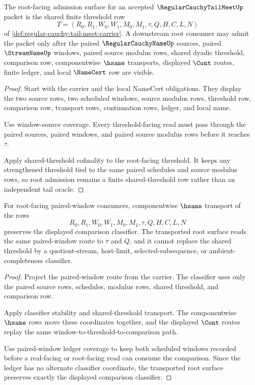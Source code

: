 \begin{theorem}
\label{thm:regular-cauchy-tail-meet-root-carrier-admission}
The root-facing admission surface for an accepted $\RegularCauchyTailMeetUp$ packet is the shared finite threshold row
$$
T=(R_0,R_1,W_0,W_1,M_0,M_1,\tau,Q,H,C,L,N)
$$
of \autoref{def:regular-cauchy-tail-meet-carrier}. A downstream root consumer may admit the packet only after the paired $\RegularCauchyNameUp$ sources, paired $\StreamNameUp$ windows, paired source modulus rows, shared dyadic threshold, comparison row, componentwise $\hsame$ transports, displayed $\Cont$ routes, finite ledger, and local $\NameCert$ row are visible.
\end{theorem}
\begin{proof}
Start with the carrier and the local NameCert obligations. They display the two source rows, two scheduled windows, source modulus rows, threshold row, comparison row, transport rows, continuation rows, ledger, and local name.

Use window-source coverage. Every threshold-facing read must pass through the paired sources, paired windows, and paired source modulus rows before it reaches $\tau$.

Apply shared-threshold cofinality to the root-facing threshold. It keeps any strengthened threshold tied to the same paired schedules and source modulus rows, so root admission remains a finite shared-threshold row rather than an independent tail oracle.
\end{proof}

\begin{theorem}
\label{thm:regular-cauchy-tail-meet-root-classifier-stability}
For root-facing paired-window consumers, componentwise $\hsame$ transport of the rows
$$
R_0,R_1,W_0,W_1,M_0,M_1,\tau,Q,H,C,L,N
$$
preserves the displayed comparison classifier. The transported root surface reads the same paired-window route to $\tau$ and $Q$, and it cannot replace the shared threshold by a quotient-stream, host-limit, selected-subsequence, or ambient-completeness classifier.
\end{theorem}
\begin{proof}
Project the paired-window route from the carrier. The classifier uses only the paired source rows, schedules, modulus rows, shared threshold, and comparison row.

Apply classifier stability and shared-threshold transport. The componentwise $\hsame$ rows move these coordinates together, and the displayed $\Cont$ routes replay the same window-to-threshold-to-comparison path.

Use paired-window ledger coverage to keep both scheduled windows recorded before a real-facing or root-facing read can consume the comparison. Since the ledger has no alternate classifier coordinate, the transported root surface preserves exactly the displayed comparison classifier.
\end{proof}

